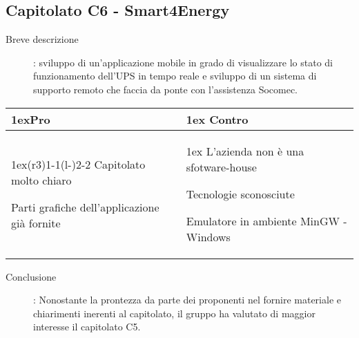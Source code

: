 \subsection*{Capitolato C6 - Smart4Energy}
\begin{description}
\item [Breve descrizione]: sviluppo di un’applicazione mobile in grado di visualizzare lo stato di funzionamento dell’UPS in tempo reale e sviluppo di un sistema di supporto remoto che faccia da ponte con l'assistenza Socomec.
\end{description}
\begin{table}[h]
\begin{tabularx}{\linewidth}{>{\parskip1ex}X@{\kern4\tabcolsep}>{\parskip1ex}X}
\hfil\bfseries Pro
&
\hfil\bfseries Contro
\\\cmidrule(r{3\tabcolsep}){1-1}\cmidrule(l{-\tabcolsep}){2-2}
Capitolato molto chiaro \par
Parti grafiche dell'applicazione già fornite
&
L'azienda non è una sfotware-house \par
Tecnologie sconosciute \par
Emulatore in ambiente MinGW - Windows \\
\end{tabularx}
\end{table}
\begin{description}
	\item [Conclusione]: Nonostante la prontezza da parte dei proponenti nel fornire materiale e chiarimenti inerenti al capitolato, il gruppo ha valutato di maggior interesse il capitolato C5.
\end{description}
